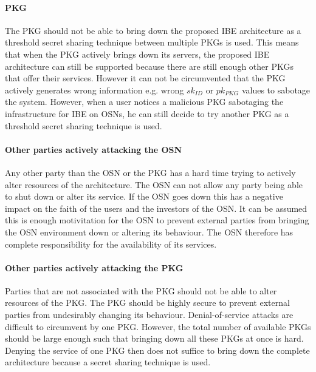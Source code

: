 \documentclass[12pt,openany]{article}
\begin{document}
\paragraph{PKG} The PKG should not be able to bring down the proposed IBE
architecture as a threshold secret sharing technique between multiple PKGs is
used. This means that when the PKG actively brings down its servers, the
proposed IBE architecture can still be supported because there are still enough
other PKGs that offer their services. However it can not be circumvented that
the PKG actively generates wrong information e.g. wrong $sk_{ID}$ or $pk_{PKG}$
values to sabotage the system. However, when a user notices a malicious PKG
sabotaging the infrastructure for IBE on OSNs, he can still decide to try
another PKG as a threshold secret sharing technique is used.

\paragraph{Other parties actively attacking the OSN} Any other party than the
OSN or the PKG has a hard time trying to actively alter resources of the
architecture. The OSN can not allow any party being able to shut down or alter
its service. If the OSN goes down this has a negative impact on the faith of the
users and the investors of the OSN. It can be assumed this is enough
motivitation for the OSN to prevent external parties from bringing the OSN
environment down or altering its behaviour. The OSN therefore has complete
responsibility for the availability of its services.

\paragraph{Other parties actively attacking the PKG} Parties that are not
associated with the PKG should not be able to alter resources of the PKG. The
PKG should be highly secure to prevent external parties from undesirably
changing its behaviour. Denial-of-service attacks are difficult to circumvent by
one PKG. However, the total number of available PKGs should be large enough such
that bringing down all these PKGs at once is hard. Denying the service of one
PKG then does not suffice to bring down the complete architecture because a
secret sharing technique is used.
\end{document}
